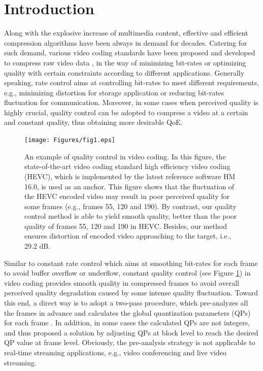 \documentclass[smallabstract,smallcaptions]{dccpaper}
\begin{document}
\section{Introduction}
\vspace{-1.0em}
Along with the explosive increase of multimedia content, effective and efficient compression algorithms have been always in demand for decades. Catering for such demand, various video coding standards have been proposed and developed to compress raw video data \cite{wiegand2003overview, sullivan2012overview, mukherjee2013latest}, in the way of minimizing bit-rates or optimizing quality with certain constraints according to different applications. Generally speaking, rate control \cite{li2014domain, li2016opti} aims at controlling bit-rates to meet different requirements, e.g., minimizing distortion for storage application or reducing bit-rates fluctuation for communication. Moreover, in some cases when perceived quality is highly crucial, quality control can be adopted to compress a video at a certain and constant quality, thus obtaining more desirable QoE.

\begin{figure}[h]
  \begin{center}
   \texttt{[image: Figures/fig1.eps]}
  \end{center}
  \vspace{-1.5em}
\caption{\label{fig1}\footnotesize{An example of quality control in video coding. In this figure, the state-of-the-art video coding standard high efficiency video coding (HEVC), which is implemented by the latest reference software HM 16.0, is used as an anchor. This figure shows that the fluctuation of the HEVC encoded video may result in poor perceived quality for some frames (e.g., frames 55, 120 and 190). By contrast, our quality control method is able to yield smooth quality, better than the poor quality of frames 55, 120 and 190 in HEVC. Besides, our method ensures distortion of encoded video approaching to the target, i.e., 29.2 dB.}}
\end{figure}


Similar to constant rate control which aims at smoothing bit-rates for each frame to avoid buffer overflow or underflow, constant quality control (see Figure \ref{fig1}) in video coding provides smooth quality in compressed frames to avoid overall perceived quality degradation caused by some intense quality fluctuation. Toward this end, a direct way is to adopt a two-pass procedure, which pre-analyzes all the frames in advance and calculates the global quantization parameters (QPs) for each frame \cite{yu2001novel} \cite{lin1998bit} \cite{lee1994temporally}. In addition, in some cases the calculated QPs are not integers, and \cite{he2001low} thus proposed a solution by adjusting QPs at block level to reach the desired QP value at frame level. Obviously, the pre-analysis strategy is not applicable to real-time streaming applications, e.g., video conferencing and live video streaming.
\end{document}
